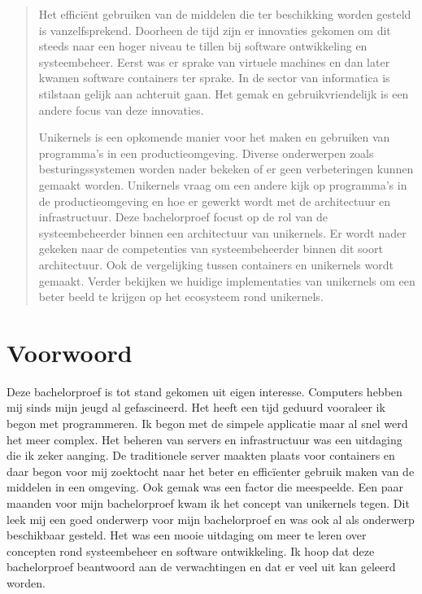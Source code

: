 \documentclass[pdftex,a4paper,12pt,twoside]{report}
\begin{document}
\begin{abstract}

Het efficiënt gebruiken van de middelen die ter beschikking worden gesteld is vanzelfsprekend. Doorheen de tijd zijn er innovaties gekomen om dit steeds naar een hoger niveau te tillen bij software ontwikkeling en systeembeheer. Eerst was er sprake van virtuele machines en dan later kwamen software containers ter sprake. In de sector van informatica is stilstaan gelijk aan achteruit gaan. Het gemak en gebruikvriendelijk is een andere focus van deze innovaties. 

Unikernels is een opkomende manier voor het maken en gebruiken van programma's in een productieomgeving. Diverse onderwerpen zoals besturingssystemen worden nader bekeken of er geen verbeteringen kunnen gemaakt worden. Unikernels vraag om een andere kijk op programma's in de productieomgeving en hoe er gewerkt wordt met de architectuur en infrastructuur. Deze bachelorproef focust op de rol van de systeembeheerder binnen een architectuur van unikernels. Er wordt nader gekeken naar de competenties van systeembeheerder binnen dit soort architectuur. Ook de vergelijking tussen containers en unikernels wordt gemaakt. Verder bekijken we huidige implementaties van unikernels om een beter beeld te krijgen op het ecosysteem rond unikernels.

\end{abstract}

\chapter*{Voorwoord}
\label{ch:voorwoord}

Deze bachelorproef is tot stand gekomen uit eigen interesse. Computers hebben mij sinds mijn jeugd al gefascineerd. Het heeft een tijd geduurd vooraleer ik begon met programmeren. Ik begon met de simpele applicatie maar al snel werd het meer complex.  Het beheren van servers en infrastructuur was een uitdaging die ik zeker aanging. De traditionele server maakten plaats voor containers en daar begon voor mij zoektocht naar het beter en efficïenter gebruik maken van de middelen in een omgeving. Ook gemak was een factor die meespeelde. Een paar maanden voor mijn bachelorproef kwam ik het concept van unikernels tegen. Dit leek mij een goed onderwerp voor mijn bachelorproef en was ook al als onderwerp beschikbaar gesteld. Het was een mooie uitdaging om meer te leren over concepten rond systeembeheer en software ontwikkeling. Ik hoop dat deze bachelorproef beantwoord aan de verwachtingen en dat er veel uit kan geleerd worden.
\end{document}
